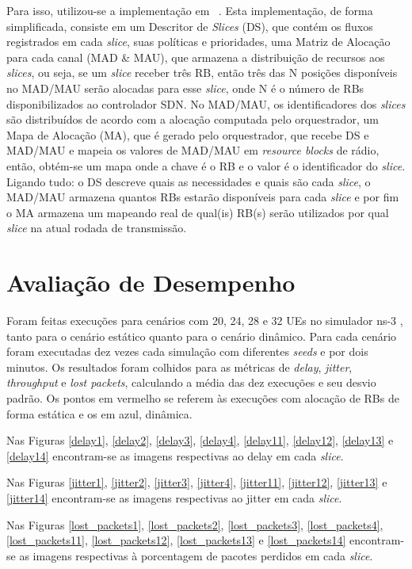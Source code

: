 \documentclass[12pt, a4paper]{article}
\begin{document}
Para isso, utilizou-se a implementação em ~\cite{rezende3}. Esta implementação, de forma simplificada, consiste em um Descritor de \textit{Slices} (DS), que contém os fluxos registrados em cada \textit{slice}, suas políticas e prioridades, uma Matriz de Alocação para cada canal (MAD \& MAU), que armazena a distribuição de recursos aos \textit{slices}, ou seja,  se um \textit{slice} receber três RB, então três das N posições disponíveis no MAD/MAU serão alocadas para esse \textit{slice}, onde N é o número de RBs disponibilizados ao controlador SDN. No MAD/MAU, os identificadores dos \textit{slices} são distribuídos de acordo com a alocação computada pelo orquestrador, um Mapa de Alocação (MA), que é gerado pelo orquestrador, que recebe DS e MAD/MAU e mapeia os valores de MAD/MAU em \textit{resource blocks} de rádio, então, obtém-se um mapa onde a chave é o RB e o valor é o identificador do \textit{slice}. Ligando tudo: o DS descreve quais as necessidades e quais são cada \textit{slice}, o MAD/MAU armazena quantos RBs estarão disponíveis para cada \textit{slice} e por fim o MA armazena um mapeando real de qual(is) RB(s) serão utilizados por qual \textit{slice} na atual rodada de transmissão.

\section{Avaliação de Desempenho}

Foram feitas execuções para cenários com 20, 24, 28 e 32 UEs no simulador ns-3 \cite{ns3}, tanto para o cenário estático quanto para o cenário dinâmico. Para cada cenário foram executadas dez vezes cada simulação com diferentes \textit{seeds} e por dois minutos. Os resultados foram colhidos para as métricas de \textit{delay}, \textit{jitter}, \textit{throughput} e \textit{lost packets}, calculando a média das dez execuções e seu desvio padrão. Os pontos em vermelho se referem às execuções com alocação de RBs de forma estática e os em azul, dinâmica.

Nas Figuras \ref{delay1}, \ref{delay2}, \ref{delay3}, \ref{delay4}, \ref{delay11}, \ref{delay12}, \ref{delay13} e \ref{delay14} encontram-se as imagens respectivas ao delay em cada \textit{slice}.

Nas Figuras \ref{jitter1}, \ref{jitter2}, \ref{jitter3}, \ref{jitter4}, \ref{jitter11}, \ref{jitter12}, \ref{jitter13} e \ref{jitter14} encontram-se as imagens respectivas ao jitter em cada \textit{slice}.   

Nas Figuras \ref{lost_packets1}, \ref{lost_packets2}, \ref{lost_packets3}, \ref{lost_packets4}, \ref{lost_packets11}, \ref{lost_packets12}, \ref{lost_packets13} e \ref{lost_packets14} encontram-se as imagens respectivas à porcentagem de pacotes perdidos em cada \textit{slice}.
\end{document}
